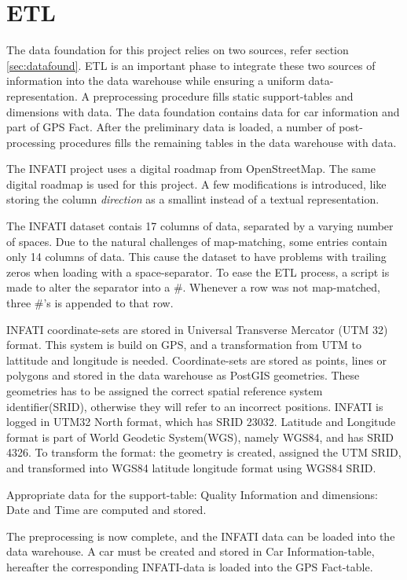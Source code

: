 \section{ETL}\label{sec:ETL}
The data foundation for this project relies on two sources, refer section \ref{sec:datafound}. ETL is an important phase to integrate these two sources of information into the data warehouse while ensuring a uniform data-representation. A preprocessing procedure fills static support-tables and dimensions with data. The data foundation contains data for car information and part of GPS Fact. After the preliminary data is loaded, a number of post-processing procedures fills the remaining tables in the data warehouse with data.

The INFATI project\cite{art:INFATI} uses a digital roadmap from OpenStreetMap\cite{osm}. The same digital roadmap is used for this project. A few modifications is introduced, like storing the column \textit{direction} as a smallint instead of a textual representation. 

The INFATI dataset\cite{art:INFATI} contais 17 columns of data, separated by a varying number of spaces. Due to the natural challenges of map-matching, some entries contain only 14 columns of data. This cause the dataset to have problems with trailing zeros when loading with a space-separator. To ease the ETL process, a script is made to alter the separator into a \#. Whenever a row was not map-matched, three \#'s is appended to that row.

INFATI coordinate-sets are stored in Universal Transverse Mercator (UTM 32) format. This system is build on GPS, and a transformation from UTM to lattitude and longitude is needed. Coordinate-sets are stored as points, lines or polygons and stored in the data warehouse as PostGIS\cite{postgis} geometries. These geometries has to be assigned the correct spatial reference system identifier(SRID), otherwise they will refer to an incorrect positions. INFATI is logged in UTM32 North format, which has SRID 23032\cite{UTM32N}. Latitude and Longitude format is part of World Geodetic System(WGS), namely WGS84, and has SRID 4326\cite{WGS84}. To transform the format: the geometry is created, assigned the UTM SRID, and transformed into WGS84 latitude longitude format using WGS84 SRID. 

Appropriate data for the support-table: Quality Information and dimensions: Date and Time are computed and stored.

The preprocessing is now complete, and the INFATI data can be loaded into the data warehouse. A car must be created and stored in Car Information-table, hereafter the corresponding INFATI-data is loaded into the GPS Fact-table. 

